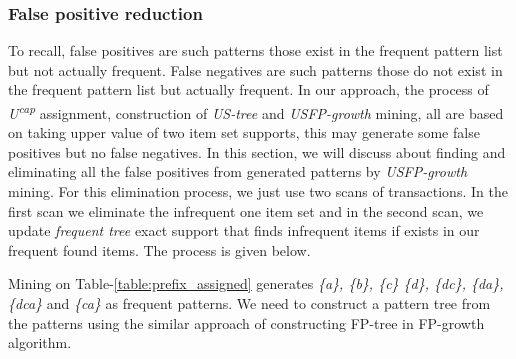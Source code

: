 \documentclass[conference]{IEEEtran}
\begin{document}
\subsubsection{False positive reduction}
    To recall, false positives are such patterns those exist in the frequent pattern list but not actually frequent. False negatives are such patterns those do not exist in the frequent pattern list but actually frequent. In our approach, the process of \emph{U\textsuperscript{cap}} assignment, construction of \emph{US-tree} and \emph{USFP-growth} mining, all are based on taking upper value of two item set supports, this may generate some false positives but no false negatives. In this section, we will discuss about finding and eliminating all the false positives from generated patterns by \emph{USFP-growth} mining. For this elimination process, we just use two scans of transactions. In the first scan we eliminate the infrequent one item set and in the second scan, we update \emph{frequent tree} exact support that finds infrequent items if exists in our frequent found items. The process is given below. 

Mining on Table-\ref{table:prefix_assigned} generates \emph{\{a\}, \{b\}, \{c\} \{d\}, \{dc\}, \{da\}, \{dca\}} and \emph{\{ca\}} as frequent patterns. We need to construct a pattern tree from the patterns using the similar approach of constructing FP-tree in FP-growth algorithm.

\end{document}
